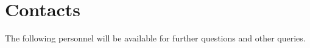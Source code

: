 \chapter{Contacts}

The following personnel will be available for further questions and other queries.

 \\
 \\